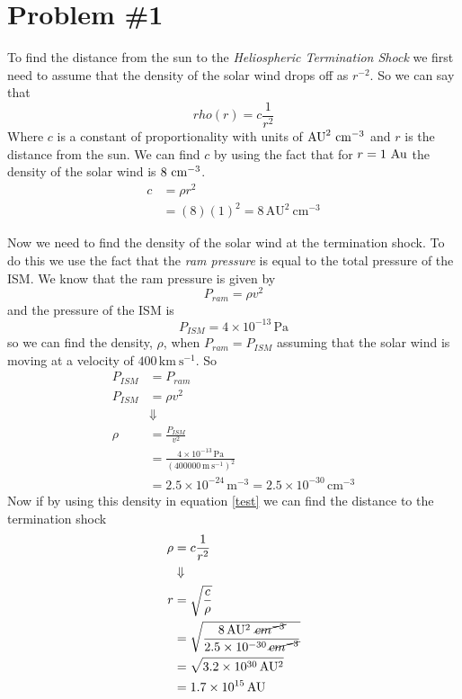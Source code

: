 \documentclass[11pt]{article}
\numberwithin{equation}{section}
\newcommand{\unit}[1]{\ensuremath{\, \mathrm{#1}}}
\begin{document}


\section{Problem \#1}
To find the distance from the sun to the \emph{Heliospheric Termination Shock} we first need to assume that the density of the solar wind drops off as $r^{-2}$. So we can say that
\begin{equation}
rho(r) = c\frac{1}{r^2}
\label{test}
\end{equation}
Where $c$ is a constant of proportionality with units of $\textnormal{AU}^2\ \textnormal{cm}^{-3}$ and $r$ is the distance from the sun. We can find $c$ by using the fact that for $r=1\ \textnormal{Au}$ the density of the solar wind is $8\ \textnormal{cm}^{-3}$.
\begin{align*}
c &= \rho r^2\\
&= (8)(1)^2 = 8\unit{AU^2\ cm^{-3}} 
\end{align*}

Now we need to find the density of the solar wind at the termination shock. To do this we use the fact that the \emph{ram pressure} is equal to the total pressure of the ISM. We know that the ram pressure is given by
$$P_{ram} = \rho v^2$$
and the pressure of the ISM is
$$P_{ISM} = 4\times10^{-13}\unit{Pa}$$
so we can find the density, $\rho$, when $P_{ram}=P_{ISM}$ assuming that the solar wind is moving at a velocity of $400\unit{km\ s^{-1}}$. So
\begin{align*}
P_{ISM} &= P_{ram}\\
P_{ISM} &= \rho v^2\\
&\Downarrow\\
\rho &= \frac{P_{ISM}}{v^2}\\
&= \frac{4\times10^{-13}\unit{Pa}}{(400000\unit{m\ s^{-1}})^2}\\
&= 2.5\times10^{-24}\unit{m^{-3}} = 2.5\times10^{-30}\unit{cm^{-3}} 
\end{align*}
Now if by using this density in equation \ref{test} we can find the distance to the termination shock
\begin{align*}
\rho &= c\frac{1}{r^2}\\
&\Downarrow\\
r &= \sqrt{\frac{c}{\rho}}\\
&= \sqrt{\frac{8\unit{AU^2\ \cancel{cm^{-3}}}}{2.5\times10^{-30}\unit{\cancel{cm^{-3}}}}}\\
&= \sqrt{3.2\times10^{30}\unit{AU^2}}\\
&= 1.7\times10^{15}\unit{AU}
\end{align*}
\end{document}
